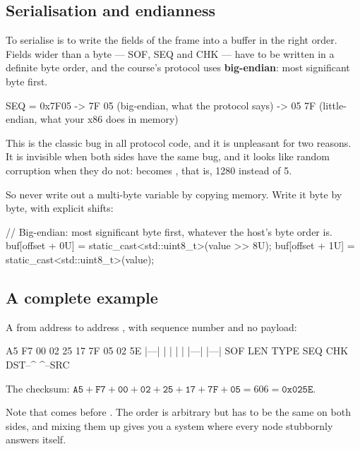 \subsection{Serialisation and endianness}

To serialise is to write the fields of the frame into a buffer in the right order. Fields wider
than a byte --- SOF, SEQ and CHK --- have to be written in a definite byte order, and the course's
protocol uses \textbf{big-endian}: most significant byte first.

\begin{console}
SEQ = 0x7F05  ->  7F 05      (big-endian, what the protocol says)
              ->  05 7F      (little-endian, what your x86 does in memory)
\end{console}

This is the classic bug in all protocol code, and it is unpleasant for two reasons. It is
invisible when both sides have the same bug, and it looks like random corruption when they do
not:  becomes , that is, 1280 instead of 5.

So never write out a multi-byte variable by copying memory. Write it byte by byte, with explicit
shifts:

\begin{cppcode}
// Big-endian: most significant byte first, whatever the host's byte order is.
buf[offset + 0U] = static_cast<std::uint8_t>(value >> 8U);
buf[offset + 1U] = static_cast<std::uint8_t>(value);
\end{cppcode}

\subsection{A complete example}

A  from address  to address , with sequence number
 and no payload:

\begin{console}
A5 F7 00 02 25 17 7F 05 02 5E
|---| |  |  |  |  |---| |---|
SOF  LEN TYPE      SEQ   CHK
        DST--^  ^--SRC
\end{console}

The checksum: $\mathtt{A5} + \mathtt{F7} + \mathtt{00} + \mathtt{02} + \mathtt{25} + \mathtt{17} +
\mathtt{7F} + \mathtt{05} = 606 = \mathtt{0x025E}$.

Note that  comes before . The order is arbitrary but has to be the same on
both sides, and mixing them up gives you a system where every node stubbornly answers itself.
